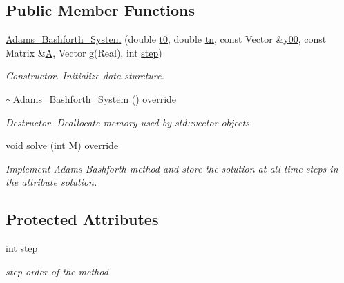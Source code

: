 \subsection*{Public Member Functions}
\begin{DoxyCompactItemize}
\item 
\mbox{\label{class_adams___bashforth___system_a5842d9c511fdf335526ed2a65bafe986}} 
\mbox{\hyperlink{class_adams___bashforth___system_a5842d9c511fdf335526ed2a65bafe986}{Adams\+\_\+\+Bashforth\+\_\+\+System}} (double \mbox{\hyperlink{class_o_d_e___system_a1947b357608babc98c5e79d645e24c3c}{t0}}, double \mbox{\hyperlink{class_o_d_e___system_a5c5a0dd9f04dfb8d8a84d49b741773af}{tn}}, const Vector \&\mbox{\hyperlink{class_o_d_e___system_a1379137a4480e5861fd1911bc061f908}{y00}}, const Matrix \&\mbox{\hyperlink{class_o_d_e___system_a632009677e80b62a1996e842398bf8b6}{A}}, Vector \mbox{\hyperlink{class_o_d_e___system_a2dee2a4b3468547c3ddab15edfc8ddfd}{g}}(Real), int \mbox{\hyperlink{class_adams___bashforth___system_abc285f795f629737fb82c223b896c5e8}{step}})
\begin{DoxyCompactList}\small\item\em Constructor. Initialize data sturcture. \end{DoxyCompactList}\item 
\mbox{\label{class_adams___bashforth___system_af183f3376f969b50d1a09305a5bff62b}} 
\mbox{\hyperlink{class_adams___bashforth___system_af183f3376f969b50d1a09305a5bff62b}{$\sim$\+Adams\+\_\+\+Bashforth\+\_\+\+System}} () override
\begin{DoxyCompactList}\small\item\em Destructor. Deallocate memory used by std\+::vector objects. \end{DoxyCompactList}\item 
void \mbox{\hyperlink{class_adams___bashforth___system_acaf33d4f9f715a20a106f9029135cfe6}{solve}} (int M) override
\begin{DoxyCompactList}\small\item\em Implement Adams Bashforth method and store the solution at all time steps in the attribute solution. \end{DoxyCompactList}\end{DoxyCompactItemize}
\subsection*{Protected Attributes}
\begin{DoxyCompactItemize}
\item 
\mbox{\label{class_adams___bashforth___system_abc285f795f629737fb82c223b896c5e8}} 
int \mbox{\hyperlink{class_adams___bashforth___system_abc285f795f629737fb82c223b896c5e8}{step}}
\begin{DoxyCompactList}\small\item\em step order of the method \end{DoxyCompactList}\end{DoxyCompactItemize}
